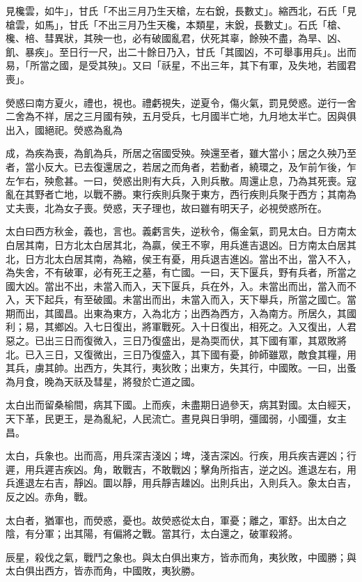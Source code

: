 \begin{pinyinscope}
見欃雲，如牛」，甘氏「不出三月乃生天槍，左右銳，長數丈」。縮西北，石氏「見槍雲，如馬」，甘氏「不出三月乃生天欃，本類星，末銳，長數丈」。石氏「槍、欃、棓、彗異狀，其殃一也，必有破國亂君，伏死其辜，餘殃不盡，為旱、凶、飢、暴疾」。至日行一尺，出二十餘日乃入，甘氏「其國凶，不可舉事用兵」。出而易，「所當之國，是受其殃」。又曰「祅星，不出三年，其下有軍，及失地，若國君喪」。

熒惑曰南方夏火，禮也，視也。禮虧視失，逆夏令，傷火氣，罰見熒惑。逆行一舍二舍為不祥，居之三月國有殃，五月受兵，七月國半亡地，九月地太半亡。因與俱出入，國絕祀。熒惑為亂為

成，為疾為喪，為飢為兵，所居之宿國受殃。殃還至者，雖大當小；居之久殃乃至者，當小反大。已去復還居之，若居之而角者，若動者，繞環之，及乍前乍後，乍左乍右，殃愈甚。一曰，熒惑出則有大兵，入則兵散。周還止息，乃為其死喪。寇亂在其野者亡地，以戰不勝。東行疾則兵聚于東方，西行疾則兵聚于西方；其南為丈夫喪，北為女子喪。熒惑，天子理也，故曰雖有明天子，必視熒惑所在。

太白曰西方秋金，義也，言也。義虧言失，逆秋令，傷金氣，罰見太白。日方南太白居其南，日方北太白居其北，為贏，侯王不寧，用兵進吉退凶。日方南太白居其北，日方北太白居其南，為縮，侯王有憂，用兵退吉進凶。當出不出，當入不入，為失舍，不有破軍，必有死王之墓，有亡國。一曰，天下匽兵，野有兵者，所當之國大凶。當出不出，未當入而入，天下匽兵，兵在外，入。未當出而出，當入而不入，天下起兵，有至破國。未當出而出，未當入而入，天下舉兵，所當之國亡。當期而出，其國昌。出東為東方，入為北方；出西為西方，入為南方。所居久，其國利；易，其鄉凶。入七日復出，將軍戰死。入十日復出，相死之。入又復出，人君惡之。已出三日而復微入，三日乃復盛出，是為耎而伏，其下國有軍，其眾敗將北。已入三日，又復微出，三日乃復盛入，其下國有憂，帥師雖眾，敵食其糧，用其兵，虜其帥。出西方，失其行，夷狄敗；出東方，失其行，中國敗。一曰，出蚤為月食，晚為天祅及彗星，將發於亡道之國。

太白出而留桑榆間，病其下國。上而疾，未盡期日過參天，病其對國。太白經天，天下革，民更王，是為亂紀，人民流亡。晝見與日爭明，彊國弱，小國彊，女主昌。

太白，兵象也。出而高，用兵深吉淺凶；埤，淺吉深凶。行疾，用兵疾吉遲凶；行遲，用兵遲吉疾凶。角，敢戰吉，不敢戰凶；擊角所指吉，逆之凶。進退左右，用兵進退左右吉，靜凶。圜以靜，用兵靜吉趮凶。出則兵出，入則兵入。象太白吉，反之凶。赤角，戰。

太白者，猶軍也，而熒惑，憂也。故熒惑從太白，軍憂；離之，軍舒。出太白之陰，有分軍；出其陽，有偏將之戰。當其行，太白還之，破軍殺將。

辰星，殺伐之氣，戰鬥之象也。與太白俱出東方，皆赤而角，夷狄敗，中國勝；與太白俱出西方，皆赤而角，中國敗，夷狄勝。


\end{pinyinscope}
